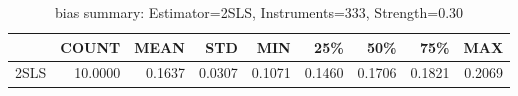 \begin{table}[ht]
\centering
\caption{bias summary: Estimator=2SLS, Instruments=333, Strength=0.30}
\begin{tabular}{lrrrrrrrr}
\toprule
 & COUNT & MEAN & STD & MIN & 25\% & 50\% & 75\% & MAX \\
\midrule
2SLS & 10.0000 & 0.1637 & 0.0307 & 0.1071 & 0.1460 & 0.1706 & 0.1821 & 0.2069 \\
\bottomrule
\end{tabular}
\end{table}
